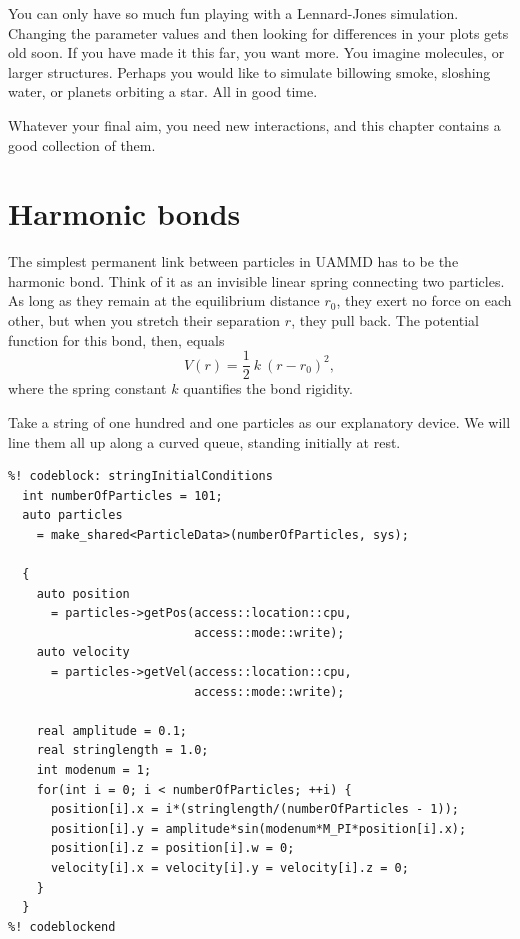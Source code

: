 
You can only have so much fun playing with a Lennard-Jones simulation. Changing
the parameter values and then looking for differences in your plots gets old
soon. If you have made it this far, you want more. You imagine molecules, or
larger structures. Perhaps you would like to simulate billowing smoke, sloshing
water, or planets orbiting a star. All in good time.

Whatever your final aim, you need new interactions, and this chapter contains a
good collection of them.

\section{Harmonic bonds}

The simplest permanent link between particles in UAMMD has to be the harmonic
bond. Think of it as an invisible linear spring connecting two particles. As
long as they remain at the equilibrium distance $r_0$, they exert no force on
each other, but when you stretch their separation $r$, they pull back. The
potential function for this bond, then, equals
\begin{equation*}
  V(r) = \frac{1}{2}\ k\ (r - r_0)^2,
\end{equation*}
where the spring constant $k$ quantifies the bond rigidity.

Take a string of one hundred and one particles as our explanatory device. We
will line them all up along a curved queue, standing initially at rest.
\label{stringInitialConditions}
\begin{lstlisting}
%! codeblock: stringInitialConditions
  int numberOfParticles = 101;
  auto particles
    = make_shared<ParticleData>(numberOfParticles, sys);

  {
    auto position
      = particles->getPos(access::location::cpu,
                          access::mode::write);
    auto velocity
      = particles->getVel(access::location::cpu,
                          access::mode::write);

    real amplitude = 0.1;
    real stringlength = 1.0;
    int modenum = 1;
    for(int i = 0; i < numberOfParticles; ++i) {
      position[i].x = i*(stringlength/(numberOfParticles - 1));
      position[i].y = amplitude*sin(modenum*M_PI*position[i].x);
      position[i].z = position[i].w = 0;
      velocity[i].x = velocity[i].y = velocity[i].z = 0;
    }
  }
%! codeblockend
\end{lstlisting}


